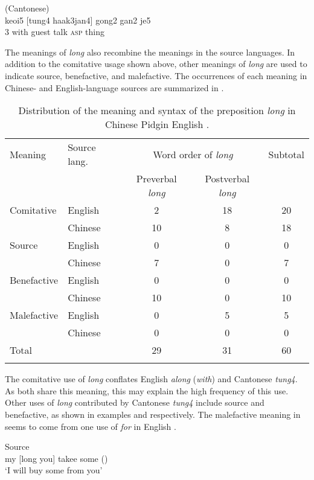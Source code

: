 \documentclass[english,output=paper,colorlinks,citecolor=brown]{../langscibook}
\begin{document}
 (Cantonese)\\
\gll keoi5  [tung4    haak3jan4]  gong2   gan2   je5\\
3  with        guest    talk \textsc{asp}  thing\\
\z

The meanings of \textit{long} also recombine the meanings in the source languages. In addition to the comitative usage shown above, other meanings of \textit{long} are used to indicate source, benefactive, and malefactive. The occurrences of each meaning in Chinese- and English-language sources are summarized in .

\begin{table} 
\begin{tabular}{llccc}
\lsptoprule
Meaning & Source lang. & \multicolumn{2}{c}{Word order of \textit{long}} & Subtotal\\\cmidrule(lr){3-4}
&  & Preverbal \textit{long} & Postverbal \textit{long} & \\\midrule
Comitative & English & 2 & 18 & 20\\
& Chinese & 10 & 8 & 18\\
Source & English & 0 & 0 & 0\\
& Chinese & 7 & 0 & 7\\
Benefactive & English & 0 & 0 & 0\\
& Chinese & 10 & 0 & 10\\
Malefactive & English & 0 & 5 & 5\\
& Chinese & 0 & 0 & 0\\
\midrule
Total &  & 29 & 31 & 60\\
\lspbottomrule
\end{tabular}
\caption{\label{tab:7:1}Distribution of the meaning and syntax of the preposition \textit{long} in Chinese Pidgin English \citep{Li2011}.}
\end{table}

The comitative use of \textit{long} conflates English \textit{along} (\textit{with}) and Cantonese \textit{tung4}. As both share this meaning, this may explain the high frequency of this use. Other uses of \textit{long} contributed by Cantonese \textit{tung4} include source and benefactive, as shown in examples  and  respectively. The malefactive meaning in  seems to come from one use of \textit{for} in English \citep{Li2011}. 

\ea%
    \label{ex:7:7}
Source\\
my [long you] takee some (\citealt[VI.12]{Tong1862})\\
\glt ‘I will buy some from you’
\end{document}
